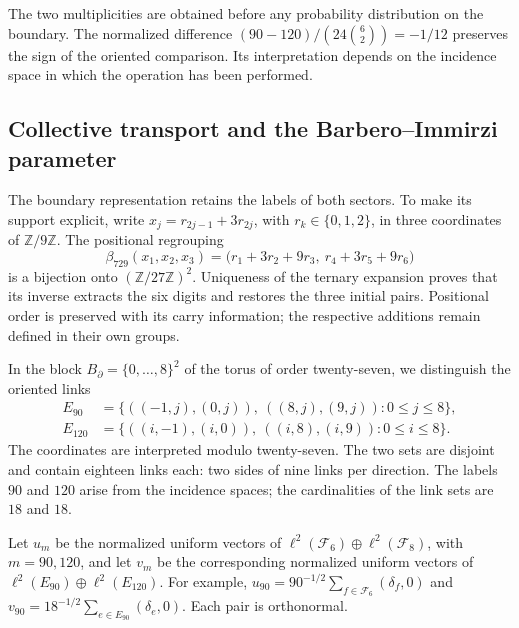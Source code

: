 The two multiplicities are obtained before any probability
distribution on the boundary. The normalized difference
\((90-120)/(24\binom62)=-1/12\) preserves the sign of the oriented
comparison. Its interpretation depends on the incidence space in which
the operation has been performed.

\subsection{Collective transport and the Barbero--Immirzi parameter}

The boundary representation retains the labels of both sectors.
To make its support explicit, write
\(x_j=r_{2j-1}+3r_{2j}\), with \(r_k\in\{0,1,2\}\), in three
coordinates of \(\mathbb Z/9\mathbb Z\). The positional regrouping
\begin{equation}
 \beta_{729}(x_1,x_2,x_3)
 =\bigl(r_1+3r_2+9r_3,\ r_4+3r_5+9r_6\bigr)
 \label{rev4:ae:reagrupamiento}
\end{equation}
is a bijection onto \((\mathbb Z/27\mathbb Z)^2\). Uniqueness of
the ternary expansion proves that its inverse extracts the six digits and
restores the three initial pairs. Positional order is preserved
with its carry information; the respective additions remain
defined in their own groups.

In the block \(B_\partial=\{0,\ldots,8\}^2\) of the torus of order
twenty-seven, we distinguish the oriented links
\begin{align}
 E_{90}&=\{((-1,j),(0,j)),\ ((8,j),(9,j)):0\le j\le8\},\\
 E_{120}&=\{((i,-1),(i,0)),\ ((i,8),(i,9)):0\le i\le8\}.
 \label{rev4:ae:enlaces}
\end{align}
The coordinates are interpreted modulo twenty-seven. The two sets
are disjoint and contain eighteen links each: two sides of
nine links per direction. The labels \(90\) and \(120\) arise
from the incidence spaces; the cardinalities of the link
sets are \(18\) and \(18\).

Let \(u_m\) be the normalized uniform vectors of
\(\ell^2(\mathcal F_6)\oplus\ell^2(\mathcal F_8)\), with
\(m=90,120\), and let \(v_m\) be the corresponding normalized
uniform vectors of \(\ell^2(E_{90})\oplus\ell^2(E_{120})\).
For example, \(u_{90}=90^{-1/2}\sum_{f\in\mathcal F_6}(\delta_f,0)\)
and \(v_{90}=18^{-1/2}\sum_{e\in E_{90}}(\delta_e,0)\).
Each pair is orthonormal.

